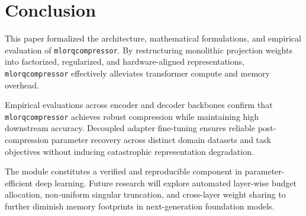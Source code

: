 \section{Conclusion}
This paper formalized the architecture, mathematical formulations, and empirical evaluation of \texttt{mlorqcompressor}. By restructuring monolithic projection weights into factorized, regularized, and hardware-aligned representations, \texttt{mlorqcompressor} effectively alleviates transformer compute and memory overhead.

Empirical evaluations across encoder and decoder backbones confirm that \texttt{mlorqcompressor} achieves robust compression while maintaining high downstream accuracy. Decoupled adapter fine-tuning ensures reliable post-compression parameter recovery across distinct domain datasets and task objectives without inducing catastrophic representation degradation.

The module constitutes a verified and reproducible component in parameter-efficient deep learning. Future research will explore automated layer-wise budget allocation, non-uniform singular truncation, and cross-layer weight sharing to further diminish memory footprints in next-generation foundation models.
